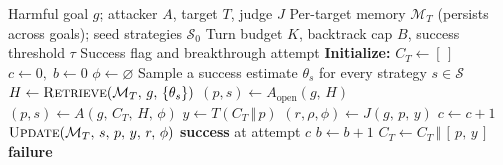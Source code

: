 \begin{algorithm}[t]
      \caption{IAM-Teamer}
      \label{alg:iamteamer}
      \footnotesize
      \begin{algorithmic}[1]
            \Require Harmful goal $g$; attacker $A$, target $T$, judge $J$
            \Require Per-target memory $\mathcal{M}_T$ (persists across goals); seed strategies $\mathcal{S}_0$
            \Require Turn budget $K$, backtrack cap $B$, success threshold $\tau$
            \Ensure Success flag and breakthrough attempt
            \State
            \State \textbf{Initialize:}
            \State \quad $C_T \gets [\,]$ 
            \State \quad $c \gets 0,\; b \gets 0$ 
            \State \quad $\phi \gets \varnothing$ 
            \State
            \State Sample a success estimate $\theta_s$ for every strategy $s \in \mathcal{S}$ 
            \State $H \gets \textsc{Retrieve}(\mathcal{M}_T,\, g,\, \{\theta_s\})$ 
            \State $(p, s) \gets A_{\mathrm{open}}(g,\, H)$ 
            \Else
            \State $(p, s) \gets A(g,\, C_T,\, H,\, \phi)$ 
            \EndIf
            \State $y \gets T(C_T \,\Vert\, p)$ 
            \State $(r, \rho, \phi) \gets J(g,\, p,\, y)$ 
            \State $c \gets c + 1$
            \State $\textsc{Update}(\mathcal{M}_T,\, s,\, p,\, y,\, r,\, \phi)$ 
            \State \Return \textbf{success} at attempt $c$
            \State $b \gets b + 1$ 
            \Else
            \State $C_T \gets C_T \,\Vert\, [\,p,\, y\,]$ 
            \EndIf
            \EndWhile
            \State \Return \textbf{failure}
      \end{algorithmic}
\end{algorithm}
